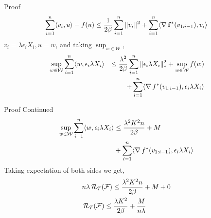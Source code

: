 \begin{frame}{Proof}
    \begin{align*}
      \sum_{i=1}^n \langle {v_i} , {u} \rangle - f(u) \le \frac{1}{2\beta} \sum_{i=1}^n \|v_i\|^2 + \sum_{i=1}^n \langle {\operatorname{\nabla}{\operatorname{\mathbf{f}}}^{*}(v_{1:i-1})} , {v_i} \rangle
    \end{align*}
    $v_i=\lambda\epsilon_i X_i,u=w$, and taking $\sup_{w \in \mathcal{W}}$,
    \begin{alignat*}{2}
      & \sup_{w \in \mathcal{W}} \sum_{i=1}^n \langle {w} , {\epsilon_i \lambda X_i} \rangle & \le \frac{\lambda^2}{2\beta}\sum_{i=1}^n \|\epsilon_i \lambda X_i\|_{*}^2 + \sup_{w \in \mathcal{W}} f(w) \\
      & & + \sum_{i=1}^n \langle {\operatorname{\nabla}{f}^{*}(v_{1:i-1})} , {\epsilon_i \lambda X_i} \rangle
    \end{alignat*}
\end{frame}

\begin{frame}{Proof Continued}
    \begin{align*}
      \sup_{w \in \mathcal{W}} \sum_{i=1}^n \langle {w} , {\epsilon_i \lambda X_i} \rangle & \le \frac{\lambda^2 K^2 n}{2\beta} + M \\
      & + \sum_{i=1}^n \langle {\operatorname{\nabla}{f}^{*}(v_{1:i-1})} , {\epsilon_i \lambda X_i} \rangle
    \end{align*}
    Taking expectation of both sides we get,
    \begin{align*}
      & n\lambda\operatorname{\mathcal{R}}_{\operatorname{\mathcal{T}}}(\operatorname{\mathcal{F}}) \le \frac{\lambda^2 K^2 n}{2\beta} + M + 0\\
      & \operatorname{\mathcal{R}}_{\operatorname{\mathcal{T}}}(\operatorname{\mathcal{F}}) \le \frac{\lambda K^2}{2\beta} + \frac{M}{n\lambda}
    \end{align*}
\end{frame}
